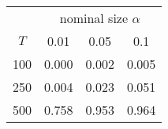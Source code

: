 % 
\begin{tabular}{cccc}
  \hline
  & \multicolumn{3}{c}{nominal size $\alpha$} \\
 $T$ & 0.01 & 0.05 & 0.1 \\
 \hline
100 & 0.000 & 0.002 & 0.005 \\ 
  250 & 0.004 & 0.023 & 0.051 \\ 
  500 & 0.758 & 0.953 & 0.964 \\ 
   \hline
\end{tabular}
